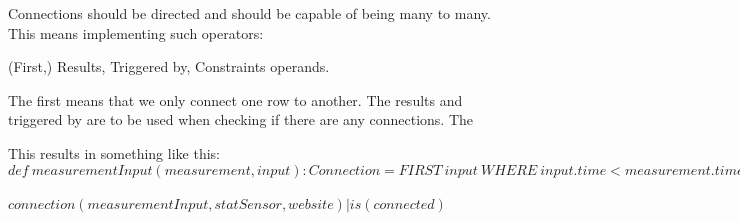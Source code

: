 Connections should be directed and should be capable of being many to many. This means implementing such operators:

(First,) Results, Triggered by,  Constraints operands.

The first means that we only connect one row to another. The results and triggered by are to be used when checking if there are any connections. The 

This results in something like this: \\
$
def\ measurementInput(measurement, input) : Connection = FIRST\ input\ WHERE\ input.time < measurement.time\ AND\ input.date >= measurement.date\ ORDER\ input.date, input.time\ ASC
$ \\\\
$
connection(measurementInput, statSensor, website)|is(connected)
$